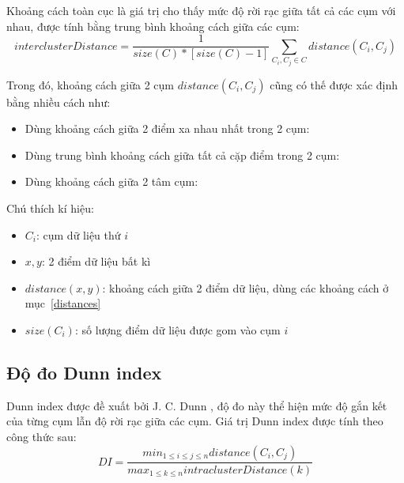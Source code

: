 	Khoảng cách toàn cục là giá trị cho thấy mức độ rời rạc giữa tất cả các cụm với nhau, được tính bằng trung bình khoảng cách giữa các cụm:
		\begin{equation}
			interclusterDistance = \frac{1}{size(C) * [size(C)-1]} \sum_{C_i, C_j \in C} distance(C_i, C_j)
		\end{equation}
	
	Trong đó, khoảng cách giữa 2 cụm $distance(C_i, C_j)$ cũng có thế được xác định bằng nhiều cách như:
		\begin{itemize}
			\item Dùng khoảng cách giữa 2 điểm xa nhau nhất trong 2 cụm:\\
			
			\item Dùng trung bình khoảng cách giữa tất cả cặp điểm trong 2 cụm:\\
			
			\item Dùng khoảng cách giữa 2 tâm cụm:\\
	\end{itemize}

	Chú thích kí hiệu: 
	\begin{itemize}
		\item $C_i$: cụm dữ liệu thứ $i$
		\item $x, y$: 2 điểm dữ liệu bất kì
		\item $distance(x, y)$: khoảng cách giữa 2 điểm dữ liệu, dùng các khoảng cách ở mục~\ref{distances}
		\item $size(C_i)$: số lượng điểm dữ liệu được gom vào cụm $i$
	\end{itemize}
	\subsection{Độ đo Dunn index}
	Dunn index được đề xuất bởi J. C. Dunn \cite{dunn1973fuzzy2}, độ đo này thể hiện mức độ gắn kết của từng cụm lẫn độ rời rạc giữa các cụm. Giá trị Dunn index được tính theo công thức sau:	
		\begin{equation} \label{dunnindex}
		DI = \frac{min_{1 \leq i \leq j \leq n}distance(C_i, C_j)}{max_{1 \leq k \leq n}intraclusterDistance(k)}
		\end{equation}
		
